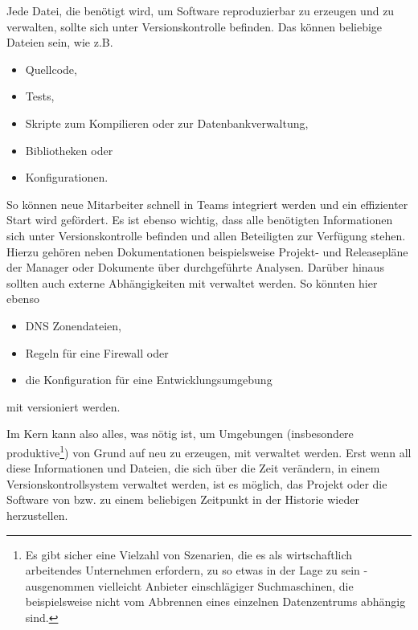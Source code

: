 Jede Datei, die benötigt wird, um Software reproduzierbar zu erzeugen und zu
verwalten, sollte sich unter Versionskontrolle befinden. Das können beliebige
Dateien sein, wie z.B.

\begin{itemize}
\item Quellcode,
\item Tests,
\item Skripte zum Kompilieren oder zur Datenbankverwaltung,
\item Bibliotheken oder
\item Konfigurationen.
\end{itemize}

So können neue Mitarbeiter schnell in Teams integriert werden und ein
effizienter Start wird gefördert. Es ist ebenso wichtig, dass alle benötigten
Informationen sich unter Versionskontrolle befinden und allen Beteiligten zur
Verfügung stehen. Hierzu gehören neben Dokumentationen beispielsweise Projekt-
und Releasepläne der Manager oder Dokumente über durchgeführte Analysen.
Darüber hinaus sollten auch externe Abhängigkeiten mit verwaltet werden. So
könnten hier ebenso

\begin{itemize}
\item DNS Zonendateien,
\item Regeln für eine Firewall oder
\item die Konfiguration für eine Entwicklungsumgebung
\end{itemize}

mit versioniert werden.

Im Kern kann also alles, was nötig ist, um Umgebungen (insbesondere
produktive\footnote{Es gibt sicher eine Vielzahl von Szenarien, die es als
wirtschaftlich arbeitendes Unternehmen erfordern, zu so etwas in der Lage zu
sein - ausgenommen vielleicht Anbieter einschlägiger Suchmaschinen, die
beispielsweise nicht vom Abbrennen eines einzelnen Datenzentrums abhängig
sind.}) von Grund auf neu zu erzeugen, mit verwaltet werden.  Erst wenn all
diese Informationen und Dateien, die sich über die Zeit verändern, in einem
Versionskontrollsystem verwaltet werden, ist es möglich, das Projekt oder die
Software von bzw. zu einem beliebigen Zeitpunkt in der Historie wieder
herzustellen. \cite[S.~33]{cd}

